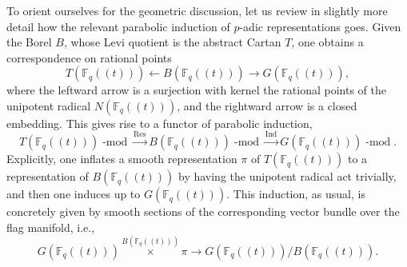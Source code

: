 \documentclass[10pt]{amsart}
\newcommand{\Fqt}{\Fq(\!(t)\!)}
\newcommand{\on}{\operatorname}
\renewcommand{\mod}{\on{-mod}}
\newcommand{\Fq}{\mathbb{F}_q}
\theoremstyle{remark}
\numberwithin{equation}{section}
\renewcommand{\mod}{\operatorname{-mod}}
\begin{document}
	
	
	\subsubsection{} 
	To orient ourselves for the geometric discussion, let us review in slightly more detail how the relevant parabolic induction of $p$-adic representations goes. Given the Borel 
	$B$, whose Levi quotient is the abstract Cartan  $T$, one obtains a correspondence on rational points
	\[
	    T(\Fqt) \leftarrow B(\Fqt) \rightarrow G(\Fqt),
	\]
	where the leftward arrow is a surjection with kernel the rational points of 
	the unipotent radical $N(\Fqt)$, and the rightward arrow is a closed 
	embedding. This gives rise to a functor of parabolic induction, 
	\begin{equation} \label{e:parindpadic}
	    T(\Fqt)\mod \xrightarrow{\on{Res}} B(\Fqt)\mod \xrightarrow{\on{Ind}} 
	    G(\Fqt)\mod.
	\end{equation}
	Explicitly, one inflates a smooth representation $\pi$ of $T(\Fqt)$ to a 
	representation of $B(\Fqt)$ by having the unipotent radical act trivially, 
	and then one induces up to $G(\Fqt)$. This induction, as usual, is concretely given 
	by smooth sections of the corresponding vector bundle over the flag 
	manifold, i.e., $$G(\Fqt) \overset{B(\Fqt)} \times \pi \rightarrow 
	G(\Fqt)/B(\Fqt).$$ 
	
	
	
\end{document}
